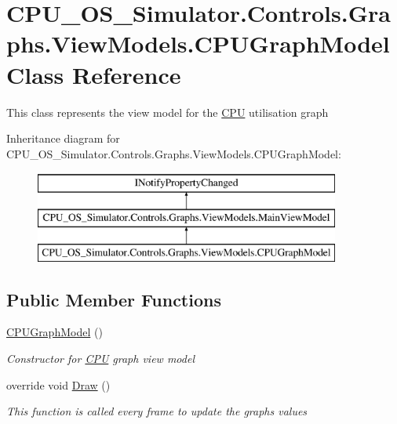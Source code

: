 \hypertarget{class_c_p_u___o_s___simulator_1_1_controls_1_1_graphs_1_1_view_models_1_1_c_p_u_graph_model}{}\section{C\+P\+U\+\_\+\+O\+S\+\_\+\+Simulator.\+Controls.\+Graphs.\+View\+Models.\+C\+P\+U\+Graph\+Model Class Reference}
\label{class_c_p_u___o_s___simulator_1_1_controls_1_1_graphs_1_1_view_models_1_1_c_p_u_graph_model}


This class represents the view model for the \hyperlink{namespace_c_p_u___o_s___simulator_1_1_c_p_u}{C\+P\+U} utilisation graph  


Inheritance diagram for C\+P\+U\+\_\+\+O\+S\+\_\+\+Simulator.\+Controls.\+Graphs.\+View\+Models.\+C\+P\+U\+Graph\+Model\+:\begin{figure}[H]
\begin{center}
\leavevmode
\includegraphics[height=3.000000cm]{class_c_p_u___o_s___simulator_1_1_controls_1_1_graphs_1_1_view_models_1_1_c_p_u_graph_model}
\end{center}
\end{figure}
\subsection*{Public Member Functions}
\begin{DoxyCompactItemize}
\item 
\hyperlink{class_c_p_u___o_s___simulator_1_1_controls_1_1_graphs_1_1_view_models_1_1_c_p_u_graph_model_a009a25deb6d40f406e36d9d17389275d}{C\+P\+U\+Graph\+Model} ()
\begin{DoxyCompactList}\small\item\em Constructor for \hyperlink{namespace_c_p_u___o_s___simulator_1_1_c_p_u}{C\+P\+U} graph view model \end{DoxyCompactList}\item 
override void \hyperlink{class_c_p_u___o_s___simulator_1_1_controls_1_1_graphs_1_1_view_models_1_1_c_p_u_graph_model_ae991fa6b6e72ce8709ace59a50c7e504}{Draw} ()
\begin{DoxyCompactList}\small\item\em This function is called every frame to update the graph\textquotesingle{}s values \end{DoxyCompactList}\end{DoxyCompactItemize}
